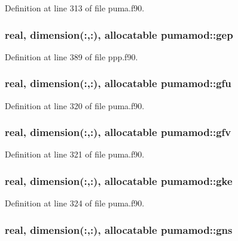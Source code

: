 \-Definition at line 313 of file puma.\-f90.

\hypertarget{classpumamod_a8f2231a34a19b8792db080ae8e4d9454}{
\subsubsection[{gep}]{\setlength{\rightskip}{0pt plus 5cm}real, dimension(\-:,\-:), allocatable {\bf pumamod\-::gep}}}
\label{classpumamod_a8f2231a34a19b8792db080ae8e4d9454}


\-Definition at line 389 of file ppp.\-f90.

\hypertarget{classpumamod_aee702bf92e2a4578e4ff0adbdafcaadb}{
\subsubsection[{gfu}]{\setlength{\rightskip}{0pt plus 5cm}real, dimension(\-:,\-:), allocatable {\bf pumamod\-::gfu}}}
\label{classpumamod_aee702bf92e2a4578e4ff0adbdafcaadb}


\-Definition at line 320 of file puma.\-f90.

\hypertarget{classpumamod_a3398d85c059c2cbe3948907b12a9058e}{
\subsubsection[{gfv}]{\setlength{\rightskip}{0pt plus 5cm}real, dimension(\-:,\-:), allocatable {\bf pumamod\-::gfv}}}
\label{classpumamod_a3398d85c059c2cbe3948907b12a9058e}


\-Definition at line 321 of file puma.\-f90.

\hypertarget{classpumamod_a9c3f9d77d6c9acc5e900cb8fce8f8ac3}{
\subsubsection[{gke}]{\setlength{\rightskip}{0pt plus 5cm}real, dimension(\-:,\-:), allocatable {\bf pumamod\-::gke}}}
\label{classpumamod_a9c3f9d77d6c9acc5e900cb8fce8f8ac3}


\-Definition at line 324 of file puma.\-f90.

\hypertarget{classpumamod_adaa3dc50fbf3e39e14e9e2e9320e8f6f}{
\subsubsection[{gns}]{\setlength{\rightskip}{0pt plus 5cm}real, dimension(\-:,\-:), allocatable {\bf pumamod\-::gns}}}
\label{classpumamod_adaa3dc50fbf3e39e14e9e2e9320e8f6f}


